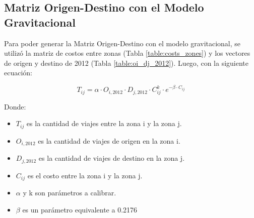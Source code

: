 \documentclass[letterpaper,12pt]{article}
\begin{document}
\subsection{Matriz Origen-Destino con el Modelo Gravitacional}
Para poder generar la Matriz Origen-Destino con el modelo gravitacional, se utilizó la matriz de costos entre zonas (Tabla \ref{table:costs_zones}) y los vectores de origen y destino de 2012 (Tabla \ref{table:oi_dj_2012}). Luego, con la siguiente ecuación: 

\begin{equation}
    T_{ij} = \alpha \cdot O_{i,2012} \cdot D_{j,2012} \cdot C_{ij}^k \cdot e^{-\beta \cdot C_{ij}}
\end{equation}

Donde:
\begin{itemize}
    \item $T_{ij}$ es la cantidad de viajes entre la zona i y la zona j.
    \item $O_{i,2012}$ es la cantidad de viajes de origen en la zona i.
    \item $D_{j,2012}$ es la cantidad de viajes de destino en la zona j.
    \item $C_{ij}$ es el costo entre la zona i y la zona j.
    \item $\alpha$ y k son parámetros a calibrar.
    \item $\beta$ es un parámetro equivalente a 0.2176
\end{itemize}
\end{document}
